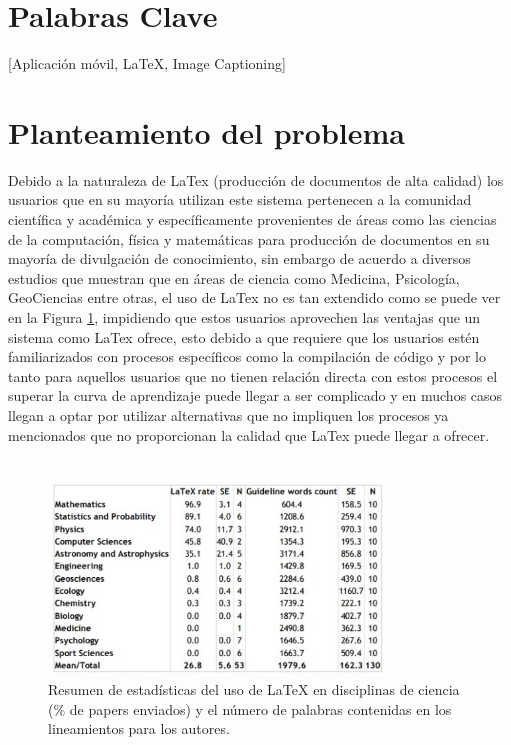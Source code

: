 \section{Palabras Clave}
[Aplicación móvil, LaTeX, Image Captioning] %
\section{Planteamiento del problema}


 Debido a la naturaleza de LaTex (producción de documentos de alta calidad) los usuarios que en su mayoría utilizan este sistema pertenecen a la comunidad científica y académica y específicamente provenientes de áreas como las ciencias de la computación, física y matemáticas para producción de documentos en su mayoría de divulgación de conocimiento, sin embargo de acuerdo a diversos estudios \cite{latexUsage} que muestran que en áreas de ciencia como Medicina, Psicología, GeoCiencias entre otras, el uso de LaTex no es tan extendido como se puede ver en la Figura \ref{fig:estadisticasUso}, impidiendo que estos usuarios aprovechen las ventajas que un sistema como LaTex ofrece, esto debido a que requiere que los usuarios estén familiarizados con procesos específicos como la compilación de código y por lo tanto para aquellos usuarios que no tienen relación directa con estos procesos el superar la curva de aprendizaje puede llegar a ser complicado y en muchos casos llegan a optar por utilizar alternativas que no impliquen los procesos ya mencionados que no proporcionan la calidad que LaTex puede llegar a ofrecer.
\\\\%

\begin{figure}
	\centering
	\includegraphics[width=0.8\textwidth]{capitulo1/images/estadisticasUso.png}
	\caption{Resumen de estadísticas del uso de LaTeX en disciplinas de ciencia (\% de papers enviados) y el número de palabras contenidas en los lineamientos para los autores.}
	\label{fig:estadisticasUso}
\end{figure}

